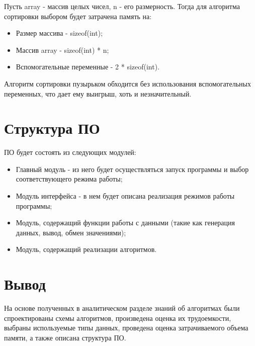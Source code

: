 Пусть array - массив целых чисел, n - его размерность. Тогда для алгоритма сортировки выбором будет затрачена память на:
\begin{itemize}
	\item Размер массива - sizeof(int);
	\item Массив array - sizeof(int) * n;
	\item Вспомогательные переменные - 2 * sizeof(int).
\end{itemize}

Алгоритм сортировки пузырьком обходится без использования вспомогательных переменных, что дает ему выигрыш, хоть и незначительный.

\section{Структура ПО}

ПО будет состоять из следующих модулей:
\begin{itemize}
	\item Главный модуль - из него будет осуществляться запуск программы и выбор соответствующего режима работы;
	\item Модуль интерфейса - в нем будет описана реализация режимов работы программы;
	\item Модуль, содержащий функции работы с данными (такие как генерация данных, вывод, обмен значениями);
	\item Модуль, содержащий реализации алгоритмов.
\end{itemize}

\section{Вывод}

На основе полученных в аналитическом разделе знаний об алгоритмах были спроектированы схемы алгоритмов, произведена оценка их трудоемкости, выбраны используемые типы данных, проведена оценка затрачиваемого объема памяти, а также описана структура ПО.